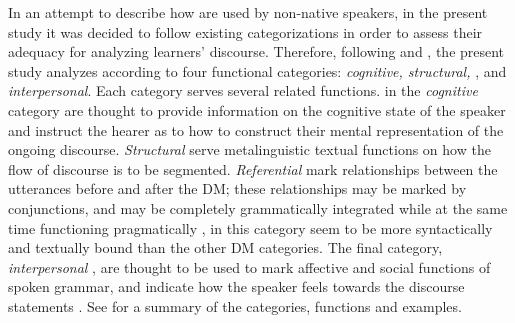 \documentclass[output=paper]{langsci/langscibook}
\begin{document}
In an attempt to describe how  are used by non-native speakers, in the present study it was decided to follow existing categorizations in order to assess their adequacy for analyzing learners’ discourse. Therefore, following \citet{Maschler1994} and \citet{FungCarter2007}, the present study analyzes  according to four functional categories: \textit{cognitive, structural, }, and \textit{interpersonal}. Each category serves several related functions.  in the \textit{cognitive} category are thought to provide information on the cognitive state of the speaker and instruct the hearer as to how to construct their mental representation of the ongoing discourse. \textit{Structural}  serve metalinguistic textual functions on how the flow of discourse is to be segmented. \textit{Referential}  mark relationships between the utterances before and after the DM; these relationships may be marked by conjunctions, and may be completely grammatically integrated while at the same time functioning pragmatically \citep{Fischer2014},  in this category seem to be more syntactically and textually bound than the other DM categories. The final category, \textit{interpersonal} , are thought to be used to mark affective and social functions of spoken grammar, and indicate how the speaker feels towards the discourse statements \citep{Andersen2001}. See  for a summary of the categories, functions and examples.

% 
% 
% 
% 
% 
% 
% 
% 
% 
% 
% 
% 
% 
% 
% 
% 
% 
% 
% 
% 
% 
% 
% 
% 
% 
% 
\end{document}
